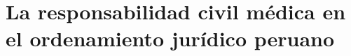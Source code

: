 %
%

\section{La responsabilidad civil médica en el ordenamiento jurídico peruano}
\label{sec:rc_medica}

